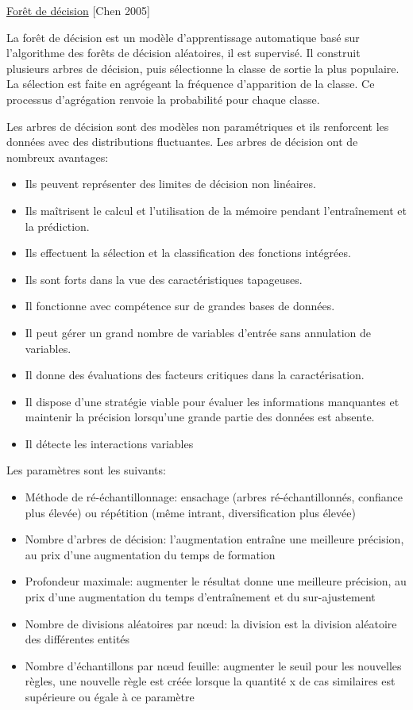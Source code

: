 \documentclass[12pt]{article}
\begin{document}
{%
 
\underline{Forêt de décision} {\color{red}[Chen 2005]}

La forêt de décision est un modèle d'apprentissage automatique basé sur l'algorithme des forêts de décision aléatoires, il est supervisé. Il construit plusieurs arbres de décision, puis sélectionne la classe de sortie la plus populaire. La sélection est faite en agrégeant la fréquence d'apparition de la classe. Ce processus d'agrégation renvoie la probabilité pour chaque classe.

Les arbres de décision sont des modèles non paramétriques et ils renforcent les données avec des distributions fluctuantes.
Les arbres de décision ont de nombreux avantages:
\begin{itemize}
\item Ils peuvent représenter des limites de décision non linéaires.
\item Ils maîtrisent le calcul et l'utilisation de la mémoire pendant l'entraînement et la prédiction.
\item Ils effectuent la sélection et la classification des fonctions intégrées.
\item Ils sont forts dans la vue des caractéristiques tapageuses.
\item Il fonctionne avec compétence sur de grandes bases de données.
\item Il peut gérer un grand nombre de variables d'entrée sans annulation de variables.
\item Il donne des évaluations des facteurs critiques dans la caractérisation.
\item Il dispose d'une stratégie viable pour évaluer les informations manquantes et maintenir la précision lorsqu'une grande partie des données est absente.
\item Il détecte les interactions variables
\end{itemize}
Les paramètres sont les suivants:
\begin{itemize}
\item Méthode de ré-échantillonnage: ensachage (arbres ré-échantillonnés, confiance plus élevée) ou répétition (même intrant, diversification plus élevée)
\item Nombre d'arbres de décision: l'augmentation entraîne une meilleure précision, au prix d'une augmentation du temps de formation
\item Profondeur maximale: augmenter le résultat donne une meilleure précision, au prix d'une augmentation du temps d'entraînement et du sur-ajustement
\item Nombre de divisions aléatoires par nœud: la division est la division aléatoire des différentes entités
\item Nombre d'échantillons par nœud feuille: augmenter le seuil pour les nouvelles règles, une nouvelle règle est créée lorsque la quantité x de cas similaires est supérieure ou égale à ce paramètre
\end{itemize}

}
\end{document}
